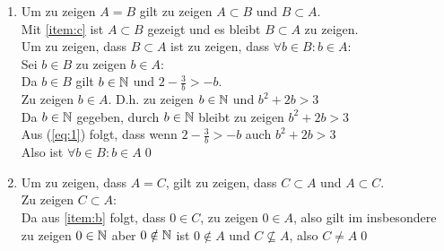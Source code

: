 \documentclass{gadsescript}
\begin{document}
\begin{enumerate}[label=(\alph*)]
	\item Um zu zeigen $ A = B $ gilt zu zeigen $ A \subset B $ und $ B \subset A $.\\
		Mit \ref{item:c} ist $ A \subset B $ gezeigt und es bleibt $ B \subset A $ zu zeigen.\\
		Um zu zeigen, dass $ B \subset A $ ist zu zeigen, dass $ \forall b \in B: b \in A $:\\
		Sei $ b \in B $ zu zeigen $ b \in A $:\\
		Da $ b \in B $ gilt $ b \in \mathbb{N} $ und $ 2 - \frac{3}{b} > -b $.\\
		Zu zeigen $ b \in A $. D.h. zu zeigen $ b \in \mathbb{N} $ und $ b^2 + 2b > 3 $\\
		Da $ b \in \mathbb{N} $ gegeben, durch $ b \in \mathbb{N} $ bleibt zu zeigen $ b^2 + 2b > 3$\\
		Aus (\ref{eq:1}) folgt, dass wenn $ 2 - \frac{3}{b} > -b $ auch $ b^2 + 2b > 3$\\
		Also ist $ \forall b \in B: b \in A $\qed
	\item Um zu zeigen, dass $ A = C $, gilt zu zeigen, dass $ C \subset A $ und $ A \subset C $.\\
		Zu zeigen $ C \subset A $:\\
		Da aus \ref{item:b} folgt, dass $ 0 \in C $, zu zeigen $ 0 \in A $, also gilt im insbesondere zu zeigen $ 0 \in \mathbb{N} $ aber $ 0 \notin \mathbb{N} $ ist $ 0 \notin A $ und $ C \nsubseteq A $, also $ C \neq A $\qed

\end{enumerate}
\end{document}
